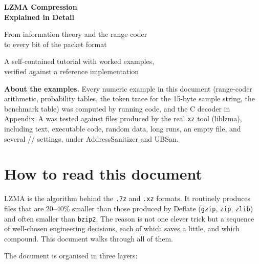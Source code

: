 \documentclass[11pt,a4paper,oneside]{book}
\newcommand{\code}[1]{\texttt{\detokenize{#1}}}
\begin{document}
\begin{titlepage}
\centering
\vspace*{2.5cm}
{\Huge\bfseries LZMA Compression\\[0.3em] Explained in Detail\par}
\vspace{0.8cm}
{\Large From information theory and the range coder\\ to every bit of the packet format\par}
\vspace{1.6cm}
{\large A self-contained tutorial with worked examples,\\ verified against a reference implementation\par}
\vfill
\begin{tcolorbox}[colback=black!3,colframe=black!30,width=0.85\textwidth,left=6pt,right=6pt]
\small\raggedright
\textbf{About the examples.} Every numeric example in this document (range-coder arithmetic, probability
tables, the token trace for the 15-byte sample string, the benchmark table) was computed by running code,
and the C decoder in Appendix~A was tested against files produced by the real \texttt{xz} tool (liblzma), including text,
executable code, random data, long runs, an empty file, and several \code{lc}/\code{lp}/\code{pb} settings, under AddressSanitizer
and UBSan.
\end{tcolorbox}
\vspace{1cm}
\end{titlepage}

\frontmatter
\tableofcontents

\chapter*{How to read this document}

LZMA is the algorithm behind the \texttt{.7z} and \texttt{.xz} formats. It routinely produces files that are 20--40\%
smaller than those produced by Deflate (\texttt{gzip}, \texttt{zip}, \texttt{zlib}) and often smaller than \texttt{bzip2}.
The reason is not one clever trick but a sequence of well-chosen engineering decisions, each of which saves a
little, and which compound. This document walks through all of them.

The document is organised in three layers:
\end{document}
